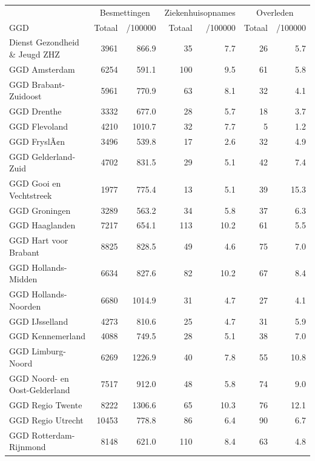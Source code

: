 \documentclass[
  english,
  man,floatsintext]{apa6}
\begin{document}
\begin{table}[H]
\centering\begingroup\fontsize{10}{12}\selectfont

\begin{threeparttable}
\begin{tabular}{lrrrrrr}
\toprule
\multicolumn{1}{c}{ } & \multicolumn{2}{c}{Besmettingen} & \multicolumn{2}{c}{Ziekenhuisopnames} & \multicolumn{2}{c}{Overleden} \\
\cmidrule(l{3pt}r{3pt}){2-3} \cmidrule(l{3pt}r{3pt}){4-5} \cmidrule(l{3pt}r{3pt}){6-7}
GGD & Totaal & /100000 & Totaal & /100000 & Totaal & /100000\\
\midrule
Dienst Gezondheid \& Jeugd ZHZ & 3961 & 866.9 & 35 & 7.7 & 26 & 5.7\\
GGD Amsterdam & 6254 & 591.1 & 100 & 9.5 & 61 & 5.8\\
GGD Brabant-Zuidoost & 5961 & 770.9 & 63 & 8.1 & 32 & 4.1\\
GGD Drenthe & 3332 & 677.0 & 28 & 5.7 & 18 & 3.7\\
GGD Flevoland & 4210 & 1010.7 & 32 & 7.7 & 5 & 1.2\\
GGD FryslÃ¢n & 3496 & 539.8 & 17 & 2.6 & 32 & 4.9\\
GGD Gelderland-Zuid & 4702 & 831.5 & 29 & 5.1 & 42 & 7.4\\
GGD Gooi en Vechtstreek & 1977 & 775.4 & 13 & 5.1 & 39 & 15.3\\
GGD Groningen & 3289 & 563.2 & 34 & 5.8 & 37 & 6.3\\
GGD Haaglanden & 7217 & 654.1 & 113 & 10.2 & 61 & 5.5\\
GGD Hart voor Brabant & 8825 & 828.5 & 49 & 4.6 & 75 & 7.0\\
GGD Hollands-Midden & 6634 & 827.6 & 82 & 10.2 & 67 & 8.4\\
GGD Hollands-Noorden & 6680 & 1014.9 & 31 & 4.7 & 27 & 4.1\\
GGD IJsselland & 4273 & 810.6 & 25 & 4.7 & 31 & 5.9\\
GGD Kennemerland & 4088 & 749.5 & 28 & 5.1 & 38 & 7.0\\
GGD Limburg-Noord & 6269 & 1226.9 & 40 & 7.8 & 55 & 10.8\\
GGD Noord- en Oost-Gelderland & 7517 & 912.0 & 48 & 5.8 & 74 & 9.0\\
GGD Regio Twente & 8222 & 1306.6 & 65 & 10.3 & 76 & 12.1\\
GGD Regio Utrecht & 10453 & 778.8 & 86 & 6.4 & 90 & 6.7\\
GGD Rotterdam-Rijnmond & 8148 & 621.0 & 110 & 8.4 & 63 & 4.8\\

\end{tabular}
\end{threeparttable}
\end{table}
\end{document}
